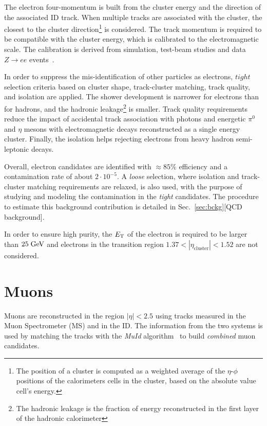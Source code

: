 The electron four-momentum is built from the cluster energy
and the direction of the associated ID track.
When multiple tracks are associated with the cluster, the closest
to the cluster direction\footnote{The position of a cluster 
is computed as a weighted average of the $\eta$-$\phi$ positions 
of the calorimeters cells in the cluster, based on the absolute 
value cell's energy.} is considered.
The track momentum is required to be compatible with the cluster energy,
which is calibrated to the electromagnetic scale. The calibration is
derived from simulation, test-beam studies and data $Z\to ee$ 
events~\cite{elecalib}.

In order to suppress the mis-identification of other particles  
as electrons, $tight$ selection criteria based on cluster shape, 
track-cluster matching, track quality, and isolation are applied.
The shower development is narrower for electrons than for hadrons, and
the hadronic leakage\footnote{The hadronic leakage is the fraction of 
energy reconstructed in the first layer of the hadronic calorimeter}
is smaller. Track quality requirements reduce the impact of accidental 
track association with photons and energetic $\pi^0$ and $\eta$ mesons
with electromagnetic decays reconstructed as a single energy cluster.
Finally, the isolation helps rejecting electrons from heavy hadron 
semi-leptonic decays.

Overall, electron candidates are identified with \mbox{$\approx{}85\%$} 
efficiency and a contamination rate of about \mbox{$2\cdot{}10^{-5}$}.
A {\it loose} selection, where isolation and track-cluster matching
requirements are relaxed, is also used, with the purpose of studying
and modeling the contamination in the {\it tight} candidates. 
The procedure to estimate this background
contribution is detailed in Sec.~\ref{sec:bckg}[QCD background].

In order to ensure high purity, the $\mbox{\ensuremath{E_{\mathrm{T}}}}$ of the electron is required
to be larger than \mbox{$25 \; \mathrm{GeV}{}$} and electrons in the transition
region $1.37<|\eta_{\mathrm{cluster}}|<1.52$ are not considered.

\section{Muons}
\label{sec:muons}

Muons are reconstructed in the region $|\eta|<2.5$ using tracks measured in the 
Muon Spectrometer (MS) and in the ID.
The information from the two systems is used by matching
the tracks with the {\it MuId} algorithm~\cite{muidalgo} to build 
{\it combined} muon candidates.

